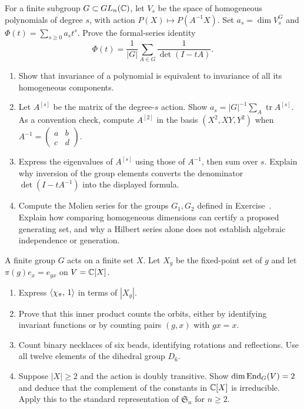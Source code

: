 \begin{exo}
\label{exo-thm-molien}
For a finite subgroup $G\subset GL_n(\mathbb{C})$, let $V_s$ be the space of
homogeneous polynomials of degree $s$, with action $P(X)\mapsto P(A^{-1}X)$.
Set $a_s=\dim V_s^G$ and $\Phi(t)=\sum_{s\geq0}a_st^s$.
Prove the formal-series identity
\begin{equation}
\label{eq-thm-molien}
 \Phi(t)=\frac1{|G|}\sum_{A\in G}\frac1{\det(I-tA)}.
\end{equation}
\begin{enumerate}
\item Show that invariance of a polynomial is equivalent to invariance
of all its homogeneous components.
\item Let $A^{[s]}$ be the matrix of the degree-$s$ action. Show
$a_s=|G|^{-1}\sum_A\operatorname{tr}A^{[s]}$. As a convention check,
compute $A^{[2]}$ in the basis $(X^2,XY,Y^2)$ when
$A^{-1}=\begin{pmatrix}a&b\\c&d\end{pmatrix}$.
\item Express the eigenvalues of $A^{[s]}$ using those of $A^{-1}$,
then sum over $s$. Explain why inversion of the group elements converts
the denominator $\det(I-tA^{-1})$ into the displayed formula.
\item Compute the Molien series for the groups $G_1,G_2$ defined in
Exercise~. Explain how comparing homogeneous
dimensions can certify a proposed generating set, and why a Hilbert series
alone does not establish algebraic independence or generation.
\end{enumerate}
\end{exo}


\begin{exo}
\label{exo-lemma-cauchy-frobenius}
A finite group $G$ acts on a finite set $X$. Let $X_g$ be the fixed-point
set of $g$ and let $\pi(g)e_x=e_{gx}$ on $V=\mathbb{C}[X]$.
\begin{enumerate}
\item Express $\langle \chi_\pi,\,1\rangle$ in terms of $|X_g|$.
\item Prove that this inner product counts the orbits, either by
identifying invariant functions or by counting pairs $(g,x)$ with $gx=x$.
\item Count binary necklaces of six beads, identifying rotations and
reflections. Use all twelve elements of the dihedral group $D_6$.
\item Suppose $|X|\geq2$ and the action is doubly transitive. Show
$\dim\operatorname{End}_G(V)=2$ and deduce that the complement of the constants in
$\mathbb{C}[X]$ is irreducible. Apply this to the standard representation of
$\mathfrak S_n$ for $n\geq2$.
\end{enumerate}
\end{exo}

